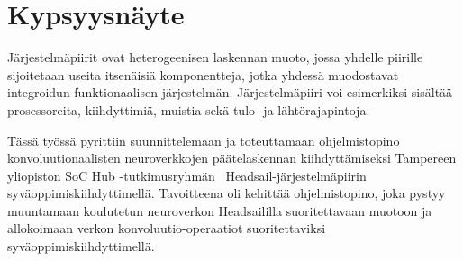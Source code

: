 \documentclass[12pt,a4paper,finnish
]{tunithesis}
\begin{document}







\clearpage





\setcounter{tocdepth}{3}              %
\tableofcontents                      %

\if@twoside
\cleardoublepage
\fi


\renewcommand{\chaptername}{} %


\chapter{Kypsyysnäyte}
\label{ch:introduction}
\setcounter{page}{1} %

Järjestelmäpiirit ovat heterogeenisen laskennan muoto, jossa yhdelle piirille sijoitetaan useita itsenäisiä komponentteja, jotka yhdessä muodostavat integroidun funktionaalisen järjestelmän.
Järjestelmäpiiri voi esimerkiksi sisältää prosessoreita, kiihdyttimiä, muistia sekä tulo- ja lähtörajapintoja.

Tässä työssä pyrittiin suunnittelemaan ja toteuttamaan ohjelmistopino konvoluutionaalisten neuroverkkojen päätelaskennan kiihdyttämiseksi Tampereen yliopiston SoC Hub -tutkimusryhmän~\cite{keelhaul} Headsail-järjestelmäpiirin sy\-vä\-op\-pi\-mis\-kiih\-dy\-tti\-me\-llä.
Tavoitteena oli kehittää ohjelmistopino, joka pystyy muuntamaan koulutetun neuroverkon Headsaililla suoritettavaan muotoon ja allokoimaan verkon konvoluutio-operaatiot suoritettaviksi syväoppimiskiihdyttimellä.
\end{document}
